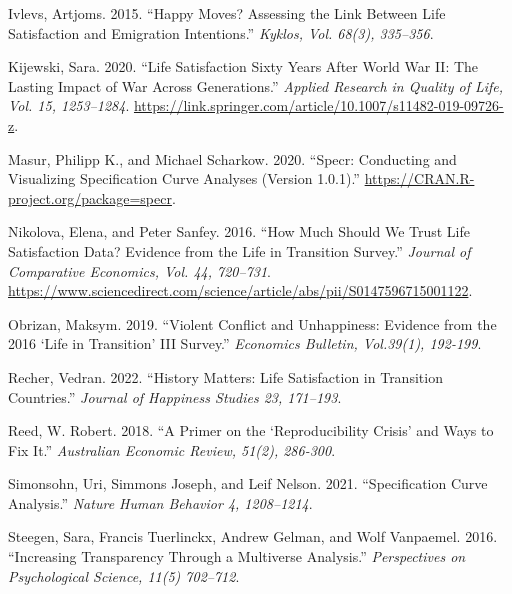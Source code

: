 \documentclass[
  letterpaper,
  DIV=11,
  numbers=noendperiod]{scrartcl}
\newlength{\cslhangindent}
\newlength{\cslentryspacingunit} %
\newenvironment{CSLReferences}[2] %
 {%
  \setlength{\parindent}{0pt}
  \ifodd #1
  \let\oldpar\par
  \def\par{\hangindent=\cslhangindent\oldpar}
  \fi
  \setlength{\parskip}{#2\cslentryspacingunit}
 }%
 {}
\begin{document}
\begin{CSLReferences}{1}{0}
\leavevmode{}%
Ivlevs, Artjoms. 2015. {``Happy Moves? Assessing the Link Between Life
Satisfaction and Emigration Intentions.''} \emph{Kyklos, Vol. 68(3),
335--356}.

\leavevmode{}%
Kijewski, Sara. 2020. {``Life Satisfaction Sixty Years After World War
II: The Lasting Impact of War Across Generations.''} \emph{Applied
Research in Quality of Life, Vol. 15, 1253--1284}.
\url{https://link.springer.com/article/10.1007/s11482-019-09726-z}.

\leavevmode{}%
Masur, Philipp K., and Michael Scharkow. 2020. {``Specr: Conducting and
Visualizing Specification Curve Analyses (Version 1.0.1).''}
\url{https://CRAN.R-project.org/package=specr}.

\leavevmode{}%
Nikolova, Elena, and Peter Sanfey. 2016. {``How Much Should We Trust
Life Satisfaction Data? Evidence from the Life in Transition Survey.''}
\emph{Journal of Comparative Economics, Vol. 44, 720--731}.
\url{https://www.sciencedirect.com/science/article/abs/pii/S0147596715001122}.

\leavevmode{}%
Obrizan, Maksym. 2019. {``Violent Conflict and Unhappiness: Evidence
from the 2016 `Life in Transition' III Survey.''} \emph{Economics
Bulletin, Vol.39(1), 192-199}.

\leavevmode{}%
Recher, Vedran. 2022. {``History Matters: Life Satisfaction in
Transition Countries.''} \emph{Journal of Happiness Studies 23,
171--193}.

\leavevmode{}%
Reed, W. Robert. 2018. {``A Primer on the {`Reproducibility Crisis'} and
Ways to Fix It.''} \emph{Australian Economic Review, 51(2), 286-300}.

\leavevmode{}%
Simonsohn, Uri, Simmons Joseph, and Leif Nelson. 2021. {``Specification
Curve Analysis.''} \emph{Nature Human Behavior 4, 1208--1214}.

\leavevmode{}%
Steegen, Sara, Francis Tuerlinckx, Andrew Gelman, and Wolf Vanpaemel.
2016. {``Increasing Transparency Through a Multiverse Analysis.''}
\emph{Perspectives on Psychological Science, 11(5) 702--712}.

\end{CSLReferences}
\end{document}
